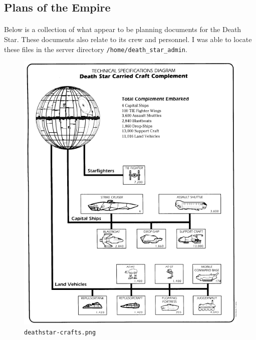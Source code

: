 \documentclass{article}
\begin{document}
\subsection{Plans of the Empire}
\paragraph{}
Below is a collection of what appear to be planning documents for the Death Star. These documents also relate to its crew and personnel. I was able to locate these files in the server directory \texttt{/home/death\_star\_admin}.

\begin{figure}[H]
	\includegraphics[width=\linewidth]{resources/plans/deathstar-crafts.png}
	\caption{\texttt{deathstar-crafts.png}}
	\label{fig:deathstar-crafts}
\end{figure}
\end{document}
